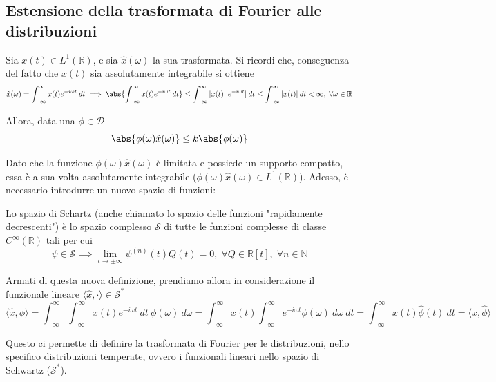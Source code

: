     \subsection{Estensione della trasformata di Fourier alle distribuzioni}
        Sia $x(t) \in L^{1}(\mathbb{R})$, e sia $\hat{x}(\omega)$ la sua trasformata.
        Si ricordi che, conseguenza del fatto che $x(t)$ sia assolutamente integrabile si ottiene
        \[
            \hat{x}(\omega) = \int_{-\infty}^{\infty} x(t) e^{-i \omega t} \: dt \implies \abs{\int_{-\infty}^{\infty} x(t) e^{-i \omega t} \: dt} \leq \int_{-\infty}^{\infty} |x(t)| |e^{-i \omega t}| \: dt \leq \int_{-\infty}^{\infty} |x(t)| \: dt < \infty, \; \forall \omega \in \mathbb{R}
        \]

        Allora, data una $\phi \in \mathcal{D}$
        \[
            \abs{\phi(\omega) \hat{x}(\omega)} \leq k \abs{\phi(\omega)}
        \]

        Dato che la funzione $\phi(\omega) \hat{x}(\omega)$ è limitata e possiede un supporto compatto, essa è a sua volta assolutamente integrabile ($\phi(\omega) \hat{x}(\omega) \in L^{1}(\mathbb{R})$).
        Adesso, è necessario introdurre un nuovo spazio di funzioni:

        \begin{definition}
            Lo spazio di Schartz (anche chiamato lo spazio delle funzioni "rapidamente decrescenti") è lo spazio complesso $\mathcal{S}$ di tutte le funzioni complesse di classe $C^{\infty}(\mathbb{R})$ tali per cui
            \[
                \psi \in \mathcal{S} \implies \lim_{t \rightarrow \pm \infty} \psi^{(n)}(t)Q(t) = 0, \; \forall Q \in \mathbb{R}[t], \; \forall n \in \mathbb{N}
            \]
        \end{definition}

        Armati di questa nuova definizione, prendiamo allora in considerazione il funzionale lineare $\langle \hat{x}, \cdot \rangle \in \mathcal{S}^{*}$
        \[
            \langle \hat{x}, \phi \rangle = \int_{-\infty}^{\infty} \int_{-\infty}^{\infty} x(t) e^{-i \omega t} \: dt \: \phi(\omega) \: d\omega = \int_{-\infty}^{\infty} x(t) \int_{-\infty}^{\infty} e^{-i \omega t} \phi(\omega) \: d\omega \: dt = \int_{-\infty}^{\infty} x(t) \hat{\phi}(t) \: dt = \langle x, \hat{\phi} \rangle
        \]

        Questo ci permette di definire la trasformata di Fourier per le distribuzioni, nello specifico distribuzioni temperate, ovvero i funzionali lineari nello spazio di Schwartz ($\mathcal{S}^{*}$).

